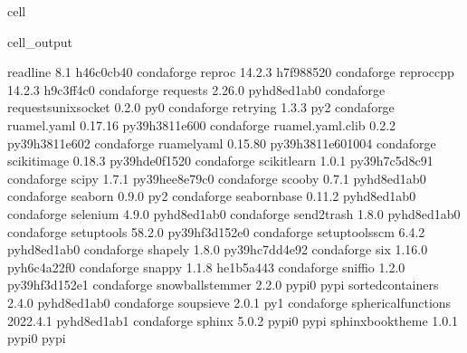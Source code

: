 \documentclass[letterpaper,table,10pt,english]{jupyterBook}
\begin{document}
\begin{sphinxuseclass}{cell}
\begin{sphinxVerbatimOutput}
\begin{sphinxuseclass}{cell_output}
\begin{sphinxVerbatim}[commandchars=\\\{\}]
readline                  8.1                  h46c0cb4\PYGZus{}0    conda\PYGZhy{}forge
reproc                    14.2.3               h7f98852\PYGZus{}0    conda\PYGZhy{}forge
reproc\PYGZhy{}cpp                14.2.3               h9c3ff4c\PYGZus{}0    conda\PYGZhy{}forge
requests                  2.26.0             pyhd8ed1ab\PYGZus{}0    conda\PYGZhy{}forge
requests\PYGZhy{}unixsocket       0.2.0                      py\PYGZus{}0    conda\PYGZhy{}forge
retrying                  1.3.3                      py\PYGZus{}2    conda\PYGZhy{}forge
ruamel.yaml               0.17.16          py39h3811e60\PYGZus{}0    conda\PYGZhy{}forge
ruamel.yaml.clib          0.2.2            py39h3811e60\PYGZus{}2    conda\PYGZhy{}forge
ruamel\PYGZus{}yaml               0.15.80         py39h3811e60\PYGZus{}1004    conda\PYGZhy{}forge
scikit\PYGZhy{}image              0.18.3           py39hde0f152\PYGZus{}0    conda\PYGZhy{}forge
scikit\PYGZhy{}learn              1.0.1            py39h7c5d8c9\PYGZus{}1    conda\PYGZhy{}forge
scipy                     1.7.1            py39hee8e79c\PYGZus{}0    conda\PYGZhy{}forge
scooby                    0.7.1              pyhd8ed1ab\PYGZus{}0    conda\PYGZhy{}forge
seaborn                   0.9.0                      py\PYGZus{}2    conda\PYGZhy{}forge
seaborn\PYGZhy{}base              0.11.2             pyhd8ed1ab\PYGZus{}0    conda\PYGZhy{}forge
selenium                  4.9.0              pyhd8ed1ab\PYGZus{}0    conda\PYGZhy{}forge
send2trash                1.8.0              pyhd8ed1ab\PYGZus{}0    conda\PYGZhy{}forge
setuptools                58.2.0           py39hf3d152e\PYGZus{}0    conda\PYGZhy{}forge
setuptools\PYGZhy{}scm            6.4.2              pyhd8ed1ab\PYGZus{}0    conda\PYGZhy{}forge
shapely                   1.8.0            py39hc7dd4e9\PYGZus{}2    conda\PYGZhy{}forge
six                       1.16.0             pyh6c4a22f\PYGZus{}0    conda\PYGZhy{}forge
snappy                    1.1.8                he1b5a44\PYGZus{}3    conda\PYGZhy{}forge
sniffio                   1.2.0            py39hf3d152e\PYGZus{}1    conda\PYGZhy{}forge
snowballstemmer           2.2.0                    pypi\PYGZus{}0    pypi
sortedcontainers          2.4.0              pyhd8ed1ab\PYGZus{}0    conda\PYGZhy{}forge
soupsieve                 2.0.1                      py\PYGZus{}1    conda\PYGZhy{}forge
spherical\PYGZus{}functions       2022.4.1           pyhd8ed1ab\PYGZus{}1    conda\PYGZhy{}forge
sphinx                    5.0.2                    pypi\PYGZus{}0    pypi
sphinx\PYGZhy{}book\PYGZhy{}theme         1.0.1                    pypi\PYGZus{}0    pypi

\end{sphinxVerbatim}
\end{sphinxuseclass}
\end{sphinxVerbatimOutput}
\end{sphinxuseclass}
\end{document}
